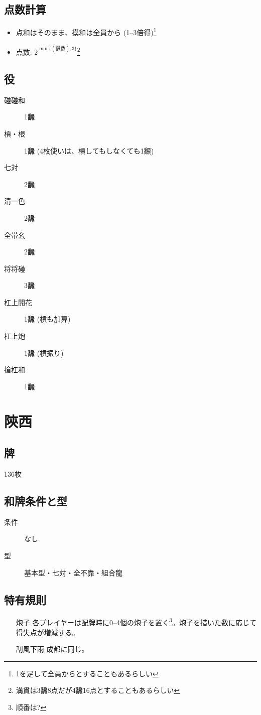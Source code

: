 \documentclass{ltjsarticle}
\begin{document}
\subsection{点数計算}
\begin{itemize}
    \item 点和はそのまま、摸和は全員から (1--3倍得)\footnote{1を足して全員からとすることもあるらしい}
    \item 点数: $2^{\min\{(\text{飜数}), 3\}}$\footnote{満貫は3飜8点だが4飜16点とすることもあるらしい}
\end{itemize}
\subsection{役}
\begin{description}
    \item[碰碰和] 1飜
    \item[槓・根] 1飜 (4枚使いは、槓してもしなくても1飜)
    \item[七対] 2飜
    \item[清一色] 2飜
    \item[全帯幺] 2飜
    \item[将将碰] 3飜
    \item[杠上開花] 1飜 (槓も加算)
    \item[杠上炮] 1飜 (槓振り)
    \item[搶杠和] 1飜
\end{description}
\section{陝西}
\subsection{牌}136枚
\subsection{和牌条件と型}
\begin{description}
    \item[条件] なし
    \item[型] 基本型・七対・全不靠・組合龍
\end{description}
\subsection{特有規則}
\begin{itemize}
    \item[炮子] 各プレイヤーは配牌時に0--4個の炮子を置く\footnote{順番は?}。炮子を措いた数に応じて得失点が増減する。
    \item[刮風下雨] 成都に同じ。
\end{itemize}
\end{document}
